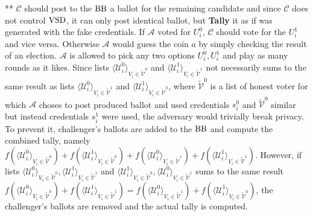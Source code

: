 ** $\mathcal{C}$ should post to the $\operatorname{BB}$ a ballot for the remaining candidate and since $\mathcal{C}$ does not control $\operatorname{VSD}$, it can only post identical ballot, but \textbf{Tally} it as if was generated with  the fake credentials. If  $\mathcal{A}$  voted for $U_i^0$, $\mathcal{C}$ should vote for the $U_i^1$ and vice versa. Otherwise  $\mathcal{A}$  would guess the coin $a$ by simply checking the result of an election. $\mathcal{A}$ is allowed to pick any two options $U_i^0,U_i^1$  and play as many rounds as it likes. Since lists $\langle \mathcal{U}^0_i \rangle _{V_i \in \tilde{\mathcal{V}}^0} $ and  $\langle \mathcal{U}^1_i \rangle _{V_i \in \tilde{\mathcal{V}}^1} $  not necessarily  sums to  the same result as lists  $\langle \mathcal{U}^0_i \rangle _{V_i \in \tilde{\mathcal{V}}^1} $ and  $\langle \mathcal{U}^1_i \rangle _{V_i \in \tilde{\mathcal{V}}^0} $, where $ \tilde{\mathcal{V}}^0$ is a list of honest voter for which $\mathcal{A}$ choses to post produced ballot and used credentials $s_i^0$ and $ \tilde{\mathcal{V}}^0$ similar but instead credentials $s_i^1$ were used, the adversary would trivially break privacy. To prevent it, challenger's ballots are added to the $\operatorname{BB}$ and compute the combined tally, namely $f(\langle \mathcal{U}^0_i \rangle _{V_i \in \tilde{\mathcal{V}}^0} ) + f(\langle \mathcal{U}^1_i \rangle _{V_i \in \tilde{\mathcal{V}}^0} )+ f(\langle \mathcal{U}^0_i \rangle _{V_i \in \tilde{\mathcal{V}}^1} ) +  f(\langle \mathcal{U}^1_i \rangle _{V_i \in \tilde{\mathcal{V}}^1} )$. However, if lists $\langle \mathcal{U}^0_i \rangle _{V_i \in \tilde{\mathcal{V}}^0}, \langle \mathcal{U}^1_i \rangle _{V_i \in \tilde{\mathcal{V}}^1}$ and $\langle \mathcal{U}^1_i \rangle _{V_i \in \tilde{\mathcal{V}}^0}, \langle \mathcal{U}^0_i \rangle _{V_i \in \tilde{\mathcal{V}}^1}$ sums to the same result $f(\langle \mathcal{U}^0_i \rangle _{V_i \in \tilde{\mathcal{V}}^0} ) + f(\langle \mathcal{U}^1_i \rangle _{V_i \in \tilde{\mathcal{V}}^1} ) =  f(\langle \mathcal{U}^0_i \rangle _{V_i \in \tilde{\mathcal{V}}^1} ) +  f(\langle \mathcal{U}^1_i \rangle _{V_i \in \tilde{\mathcal{V}}^0} )$, the challenger's ballots are removed and the actual tally is computed. \\\\
